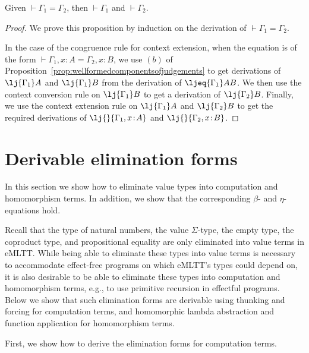 \begin{proposition}
Given $\vdash {\Gamma_1} =  \Gamma_2$, then $\vdash \Gamma_1$ and $\vdash \Gamma_2$.
\end{proposition}

\begin{proof}
We prove this proposition by induction on the derivation of $\vdash {\Gamma_1} =  \Gamma_2$. 

In the case of the congruence rule for context extension, when the equation is of the form $\vdash {\Gamma_1, x \!:\! A} = \Gamma_2, x \!:\! B$, we use $(b)$ of Proposition~\ref{prop:wellformedcomponentsofjudgements} to get derivations of $\lj {\Gamma_1} A$ and $\lj {\Gamma_1} B$ from the derivation of $\ljeq {\Gamma_1} A B$. We then use the context conversion rule on $\lj {\Gamma_1} B$ to get a derivation of $\lj {\Gamma_2} B$. Finally, we use the context extension rule on $\lj {\Gamma_1} A$ and $\lj {\Gamma_2} B$ to get the required derivations of $\lj {} {\Gamma_1, x \!:\! A}$ and $\lj {} {\Gamma_2, x \!:\! B}$.
\end{proof}


\section{Derivable elimination forms}
\label{sect:derivableeliminationforms}

In this section we show how to eliminate value types into computation and homomorphism terms. In addition, we show that the corresponding $\beta$- and $\eta$-equations hold.


Recall that the type of natural numbers, the value $\Sigma$-type, the empty type, the coproduct type,  and propositional equality are only eliminated into value terms in eMLTT. While being able to eliminate these types into value terms is necessary to accommodate effect-free programs on which eMLTT's types could depend on, it is also desirable to be able to eliminate these types into computation and homomorphism terms, e.g., to use primitive recursion in effectful programs.
Below we show that such elimination forms are derivable using thunking and forcing for computation terms, and homomorphic lambda abstraction and function application for homomorphism terms.

First, we show how to derive the elimination forms for computation terms.


